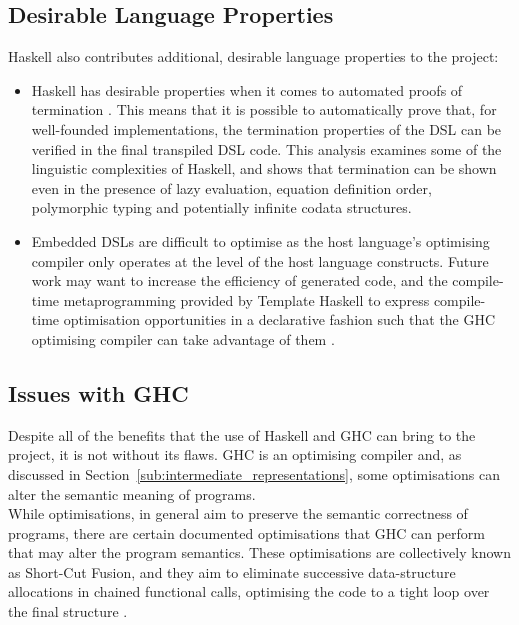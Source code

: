 \documentclass[a4paper,11pt]{report}
\begin{document}
\subsection{Desirable Language Properties} %
\label{sub:desirable_language_properties}
Haskell also contributes additional, desirable language properties to the project:
\begin{itemize}
    \item Haskell has desirable properties when it comes to automated proofs of termination \citep{Giesl:2011:ATP:1890028.1890030}.
    This means that it is possible to automatically prove that, for well-founded implementations, the termination properties of the DSL can be verified in the final transpiled DSL code. 
    This analysis examines some of the linguistic complexities of Haskell, and shows that termination can be shown even in the presence of lazy evaluation, equation definition order, polymorphic typing and potentially infinite codata structures. 
    \item Embedded DSLs are difficult to optimise as the host language's optimising compiler only operates at the level of the host language constructs. 
    Future work may want to increase the efficiency of generated code, and the compile-time metaprogramming provided by Template Haskell to express compile-time optimisation opportunities in a declarative fashion such that the GHC optimising compiler can take advantage of them \citep{seefried2004optimising}.
\end{itemize}


\subsection{Issues with GHC} %
\label{sub:issues_with_ghc}
Despite all of the benefits that the use of Haskell and GHC can bring to the project, it is not without its flaws.
GHC is an optimising compiler and, as discussed in Section~\ref{sub:intermediate_representations}, some optimisations can alter the semantic meaning of programs.\\

While optimisations, in general aim to preserve the semantic correctness of programs, there are certain documented optimisations that GHC can perform that may alter the program semantics. 
These optimisations are collectively known as Short-Cut Fusion, and they aim to eliminate successive data-structure allocations in chained functional calls, optimising the code to a tight loop over the final structure \citep{HaskellWikiShortCutFusionCorrectness}.\\
\end{document}
